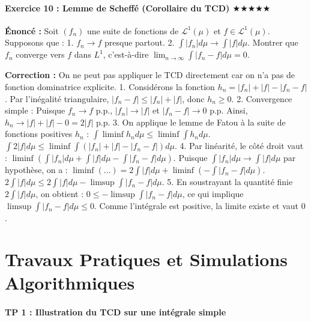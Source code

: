 \documentclass[11pt,a4paper]{article}
\begin{document}
\subsection*{{Exercice 10 : Lemme de Scheffé (Corollaire du TCD) \quad $\bigstar\bigstar\bigstar\bigstar\bigstar$}}

\textbf{Énoncé :}
Soit $(f_n)$ une suite de fonctions de $\mathcal{L}^1(\mu)$ et $f \in \mathcal{L}^1(\mu)$.
Supposons que :
1. $f_n \to f$ presque partout.
2. $\int |f_n| d\mu \to \int |f| d\mu$.
Montrer que $f_n$ converge vers $f$ dans $L^1$, c'est-à-dire $\lim_{n \to \infty} \int |f_n - f| d\mu = 0$.

\textbf{Correction :}
On ne peut pas appliquer le TCD directement car on n'a pas de fonction dominatrice explicite.
1. Considérons la fonction $h_n = |f_n| + |f| - |f_n - f|$.
   Par l'inégalité triangulaire, $|f_n - f| \le |f_n| + |f|$, donc $h_n \ge 0$.
2. Convergence simple : Puisque $f_n \to f$ p.p., $|f_n| \to |f|$ et $|f_n - f| \to 0$ p.p.
   Ainsi, $h_n \to |f| + |f| - 0 = 2|f|$ p.p.
3. On applique le lemme de Fatou à la suite de fonctions positives $h_n$ :
   $\int \liminf h_n d\mu \le \liminf \int h_n d\mu$.
   $\int 2|f| d\mu \le \liminf \int (|f_n| + |f| - |f_n - f|) d\mu$.
4. Par linéarité, le côté droit vaut :
   $\liminf \left( \int |f_n| d\mu + \int |f| d\mu - \int |f_n - f| d\mu \right)$.
   Puisque $\int |f_n| d\mu \to \int |f| d\mu$ par hypothèse, on a :
   $\liminf (\dots) = 2\int |f| d\mu + \liminf \left( - \int |f_n - f| d\mu \right)$.
   $2\int |f| d\mu \le 2\int |f| d\mu - \limsup \int |f_n - f| d\mu$.
5. En soustrayant la quantité finie $2\int |f| d\mu$, on obtient :
   $0 \le - \limsup \int |f_n - f| d\mu$, ce qui implique $\limsup \int |f_n - f| d\mu \le 0$.
   Comme l'intégrale est positive, la limite existe et vaut $0$.




\newpage
\part{Travaux Pratiques et Simulations Algorithmiques}
\subsection*{TP 1 : Illustration du TCD sur une intégrale simple}
\end{document}
